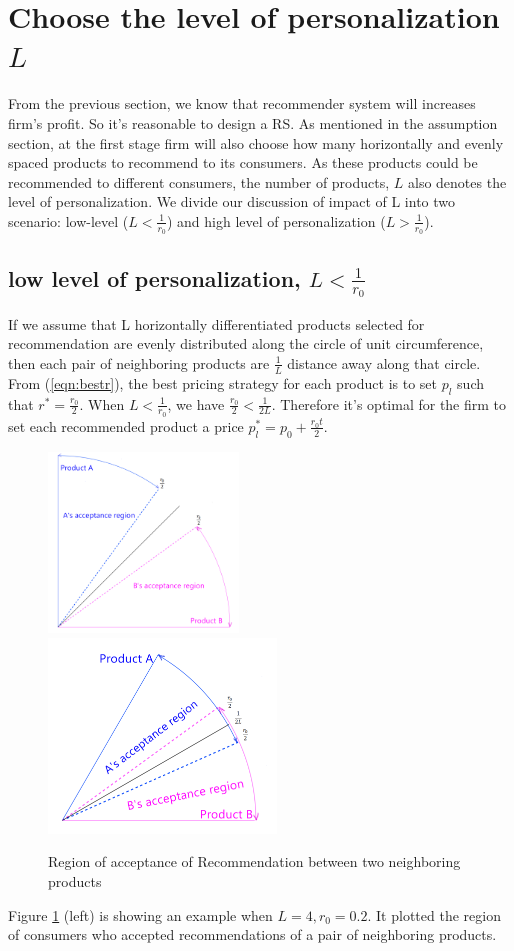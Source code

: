 \documentclass[11pt, oneside]{article}   	%
\begin{document}
\section{Choose the level of personalization $L$}
From the previous section, we know that recommender system will increases firm's profit. So it's reasonable to design a RS. As mentioned in the assumption section, at the first stage firm will also choose how many horizontally and evenly spaced products to recommend to its consumers. As these products could be recommended to different consumers, the number of products, $L$ also denotes the level of personalization. We divide our discussion of impact of L into two scenario: low-level ($L <\frac{1}{r_0}$) and high level of personalization ($L > \frac{1}{r_0}$).
\subsection{low level of personalization, $L <\frac{1}{r_0}$}
If we assume that L horizontally differentiated products selected for recommendation are evenly distributed along the circle of unit circumference, then each pair of neighboring products are $\frac{1}{L}$ distance away along that circle. From (\ref{eqn:bestr}), the best pricing strategy for each product is to set $p_l$ such that $r^* = \frac{r_0}{2}$. 
When $L <\frac{1}{r_0}$, we have $\frac{r_0}{2} <\frac{1}{2L}$. Therefore it's optimal for the firm to set each recommended product a price $p_l^* = p_0 + \frac{r_0t}{2}$. 
\begin{figure}
\centering
\includegraphics[width = 0.45\textwidth,height = 0.3\textheight]{lowlevel.png}
\includegraphics[width = 0.54\textwidth,height = 0.3\textheight]{highlevel.png}
\caption{Region of acceptance of Recommendation between two neighboring products}
\label{fig:twolevelROA}
\end{figure}
Figure \ref{fig:twolevelROA} (left)
is showing an example when $L = 4, r_0 = 0.2$. It plotted the region of consumers who accepted recommendations of a pair of neighboring products.
\end{document}
